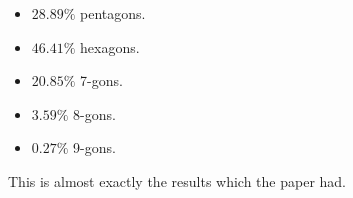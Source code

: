\documentclass{article}
\begin{document}
\begin{enumerate}[label=(\alph*)]
\begin{itemize}
        \item $28.89\%$ pentagons.
        \item $46.41\%$ hexagons.
        \item $20.85\%$ 7-gons.
        \item $3.59\%$ 8-gons.
        \item $0.27\%$ 9-gons.
    \end{itemize} This is almost exactly the results which the paper had.
\end{enumerate}
\end{document}
